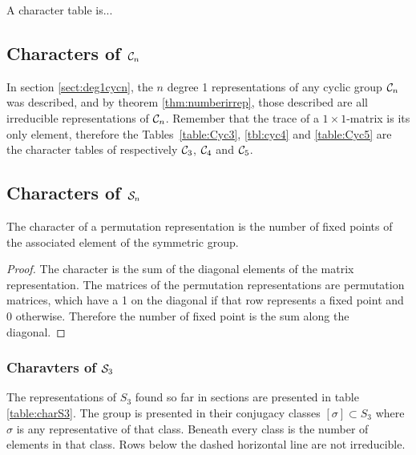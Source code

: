 \begin{definition}
	A character table is...
\end{definition}


\subsection{Characters of $\mathcal{C}_n$}

\begin{example}
	In section \ref{sect:deg1cycn}, the $n$ degree 1 representations of any cyclic group $\mathcal{C}_n$ was described, and by theorem \ref{thm:numberirrep}, those described are all irreducible representations of $\mathcal{C}_n$. Remember that the trace of a $1 \times 1$-matrix is its only element, therefore the Tables~\ref{table:Cyc3}, \ref{tbl:cyc4} and \ref{table:Cyc5} are the character tables of respectively $\mathcal{C}_3$, $\mathcal{C}_4$ and $\mathcal{C}_5$.
\end{example}

\subsection{Characters of $\mathcal{S}_n$}

\begin{theorem}
	The character of a permutation representation is the number of fixed points of the associated element of the symmetric group.
\end{theorem}
\begin{proof}
	The character is the sum of the diagonal elements of the matrix representation. The matrices of the permutation representations are permutation matrices, which have a 1 on the diagonal if that row represents a fixed point and 0 otherwise. Therefore the number of fixed point is the sum along the diagonal.
\end{proof}

\subsubsection{Charavters of $\mathcal{S}_3$}

The representations of $S_3$ found so far in sections 
are presented in table \ref{table:charS3}. The group is presented in their conjugacy classes $[\sigma] \subset S_3$ where $\sigma$ is any representative of that class. Beneath every class is the number of elements in that class. Rows below the dashed horizontal line are not irreducible.

